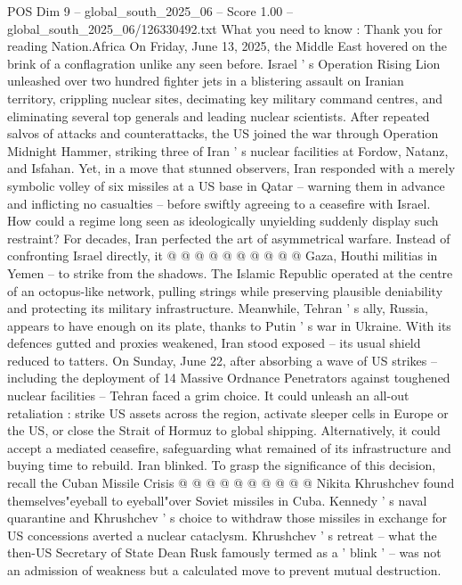 \begin{textsample}{POS Dim 9 – global\_south\_2025\_06 – Score 1.00 – global\_south\_2025\_06/126330492.txt}  \label{ex:f9_pos_190}
What you need to know : Thank you for reading Nation.Africa On Friday, June 13, 2025, the Middle East hovered on the brink of a conflagration unlike any seen before.
Israel ' s Operation Rising Lion unleashed over two hundred fighter jets in a blistering assault on Iranian territory, crippling nuclear sites, decimating key military command centres, and eliminating several top generals and leading nuclear scientists.
After repeated salvos of attacks and counterattacks, the US joined the war through Operation Midnight Hammer, striking three of Iran ' s nuclear facilities at Fordow, Natanz, and Isfahan.
Yet, in a move that stunned observers, Iran responded with a merely symbolic volley of six missiles at a US base in Qatar -- warning them in advance and inflicting no casualties -- before swiftly agreeing to a ceasefire with Israel.
How could a regime long seen as ideologically unyielding suddenly display such restraint?
For decades, Iran perfected the art of asymmetrical warfare.
Instead of confronting Israel directly, it @ @ @ @ @ @ @ @ @ @ Gaza, Houthi militias in Yemen -- to strike from the shadows.
The Islamic Republic operated at the centre of an octopus-like network, pulling strings while preserving plausible deniability and protecting its military infrastructure.
Meanwhile, Tehran ' s ally, Russia, appears to have enough on its plate, thanks to Putin ' s war in Ukraine.
With its defences gutted and proxies weakened, Iran stood exposed -- its usual shield reduced to tatters.
On Sunday, June 22, after absorbing a wave of US strikes -- including the deployment of 14 Massive Ordnance Penetrators against toughened nuclear facilities -- Tehran faced a grim choice.
It could unleash an all-out retaliation : strike US assets across the region, activate sleeper cells in Europe or the US, or close the Strait of Hormuz to global shipping.
Alternatively, it could accept a mediated ceasefire, safeguarding what remained of its infrastructure and buying time to rebuild.
Iran blinked.
To grasp the significance of this decision, recall the Cuban Missile Crisis @ @ @ @ @ @ @ @ @ @ Nikita Khrushchev found themselves"eyeball to eyeball"over Soviet missiles in Cuba.
Kennedy ' s naval quarantine and Khrushchev ' s choice to withdraw those missiles in exchange for US concessions averted a nuclear cataclysm.
Khrushchev ' s retreat -- what the then-US Secretary of State Dean Rusk famously termed as a ' blink ' -- was not an admission of weakness but a calculated move to prevent mutual destruction.

\end{textsample}
